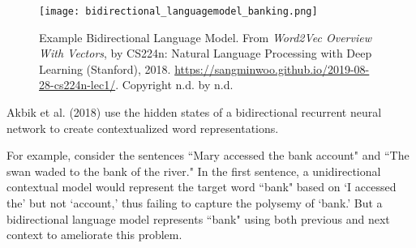 \begin{figure}[h]
\centering
\texttt{[image: bidirectional\_languagemodel\_banking.png]}
\caption{Example Bidirectional Language Model. From \emph{Word2Vec Overview With Vectors}, by CS224n: Natural Language Processing with Deep Learning (Stanford), 2018. \url{https://sangminwoo.github.io/2019-08-28-cs224n-lec1/}. Copyright n.d. by n.d.}
\end{figure}

Akbik et al. (2018) use the hidden states of a bidirectional recurrent neural network to create contextualized word representations. 

For example, consider the sentences ``Mary accessed the bank account" and ``The swan waded to the bank of the river." In the first sentence, a unidirectional contextual model would represent the target word ``bank" based on `I accessed the' but not `account,' thus failing to capture the polysemy of `bank.' But a bidirectional language model represents ``bank" using both previous and next context to ameliorate this problem.
